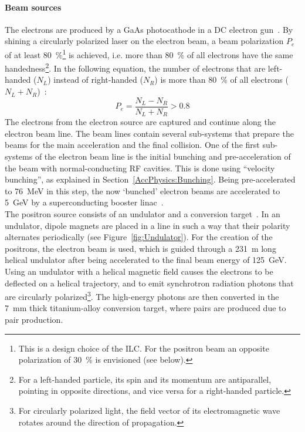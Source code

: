 \paragraph{Beam sources}
The electrons are produced by a GaAs photocathode in a DC electron gun~\cite[p. 13]{TDR32}.
By shining a circularly polarized laser on the electron beam, a beam polarization $P_e$ of at least \SI{80}{\percent}\footnote{This is a design choice of the ILC. For the positron beam an opposite polarization of \SI{30}{\percent} is envisioned (see below).} is achieved, i.e. more than \SI{80}{\percent} of all electrons have the same handedness\footnote{For a left-handed particle, its spin and its momentum are antiparallel, pointing in opposite directions, and vice versa for a right-handed particle.}.
In the following equation, the number of electrons that are left-handed ($N_L$) instead of right-handed ($N_R$) is more than \SI{80}{\percent} of all electrons ($N_L+N_R$)~\cite[p. 81]{TDR32}: 
\begin{equation}
 P_e = \frac{N_L-N_R}{N_L+N_R} > 0.8
\end{equation}
The electrons from the electron source are captured and continue along the electron beam line.
The beam lines contain several sub-systems that prepare the beams for the main acceleration and the final collision.
One of the first sub-systems of the electron beam line is the initial bunching and pre-acceleration of the beam with normal-conducting RF cavities.
This is done using ``velocity bunching'', as explained in Section~\ref{AccPhysics:Bunching}.
Being pre-accelerated to \SI{76}{\MeV} in this step, the now `bunched' electron beams are accelerated to \SI{5}{\GeV} by a  superconducting booster linac~\cite[p. 81f]{TDR32}.\\
The positron source consists of an undulator and a conversion target~\cite[p. 90f]{TDR32}.
In an undulator, dipole magnets are placed in a line in such a way that their polarity alternates periodically (see Figure~\ref{fig:Undulator}).
For the creation of the positrons, the electron beam is used, which is guided through a \SI{231}{\meter} long helical undulator after being accelerated to the final beam energy of \SI{125}{\GeV}.
Using an undulator with a helical magnetic field causes the electrons to be deflected on a helical trajectory, and to emit synchrotron radiation photons that are circularly polarized\footnote{For circularly polarized light, the field vector of its electromagnetic wave rotates around the direction of propagation.}.
The high-energy photons are then converted in the \SI{7}{\milli\meter} thick titanium-alloy conversion target, where \positron \electron pairs are produced due to pair production.
